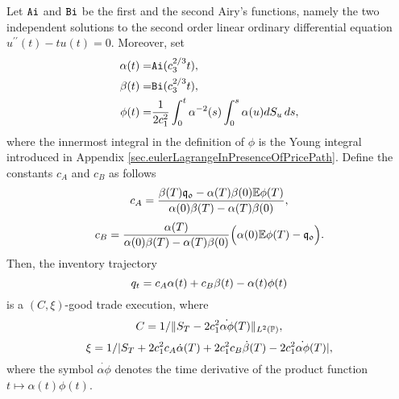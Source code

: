 \documentclass[10pt,a4paper]{article}
\begin{document}
\begin{prop}\label{prop.goodTradeExecutionTimeIC}
Let $\mathtt{Ai}$ and $\mathtt{Bi}$ be the first and the second Airy's functions, namely the two independent solutions to the second order linear ordinary differential equation $u^{\prime \prime}(t) - tu(t) = 0$. Moreover, set
\begin{equation*}
\begin{split}
\alpha(t) =& \mathtt{Ai}(c_{3}^{2/3} t),\\
\beta(t) =& \mathtt{Bi}(c_{3}^{2/3} t), \\
\phi(t) =& \frac{1}{2c_{1}^{2}}\int_{0}^{t} \alpha^{-2}(s)\int_{0}^{s}\alpha(u)dS_u \,ds,
\end{split}
\end{equation*}
where the innermost integral in the definition of $\phi$ is the Young integral introduced in Appendix \ref{sec.eulerLagrangeInPresenceOfPricePath}.
Define the constants $c_A$ and $c_B$ as follows
\begin{equation*}
c_A = \frac{\beta(T)\mathfrak{q_0} - \alpha(T)\beta(0)\mathbb{{E}}\phi(T)}
{\alpha(0)\beta(T) - \alpha(T)\beta(0)},
\end{equation*}
	\begin{equation*}
c_B = \frac{ \alpha(T)}
{\alpha(0)\beta(T) - \alpha(T)\beta(0)}\Big(\alpha(0)\mathbb{{E}}\phi(T) - \mathfrak{q_0}\Big).
\end{equation*}
Then, the inventory trajectory 
\begin{equation}\label{eq.goodTradeExecutionTimeIC}
q_t = c_A \alpha(t) + c_B\beta(t) - \alpha(t) \phi(t)
\end{equation}
is a $(C,\xi)$-good trade execution, where
\begin{equation*}
C=1/
\lVert 
S_{T} - 2c_{1}^{2} \dot{\alpha \phi}(T) 
\rVert_{L^{2}({\mathbb{P}})},
\end{equation*}
\begin{equation*}
\xi=1/
\lvert 
S_{T} 
+2c_{1}^{2} c_A\dot{\alpha}(T)
+2c_{1}^{2} c_B \dot{\beta}(T)
-2c_{1}^{2} \dot{\alpha \phi}(T)
\rvert,
\end{equation*}
where the symbol $ \dot{\alpha \phi}$ denotes the time derivative of the product function $t\mapsto\alpha(t)\phi(t)$. 
\end{prop}
\end{document}
